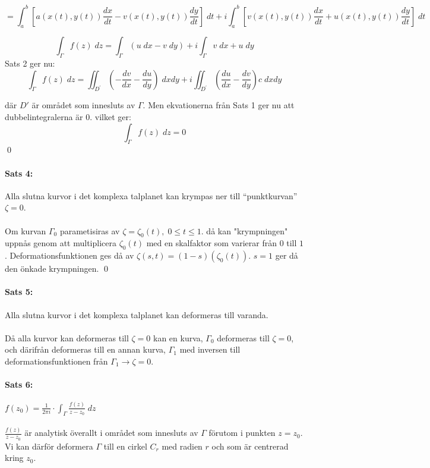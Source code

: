 \documentclass{article}
\begin{document}
$$= \int_a^b \left [a(x(t), y(t)) \frac {dx} {dt} - v(x(t), y(t)) \frac {dy} {dt} \right ] \; dt + i \int_a^b \left [v(x(t), y(t)) \frac {dx} {dt} + 
u(x(t), y (t)) \frac {dy} {dt} \right ] \; dt$$

$$\int_{\Gamma} f(z) \; dz = \int_\Gamma (u \; dx - v \; dy) + i \int_\Gamma v \; dx + u \; dy$$
Sats 2 ger nu:
$$\int_{\Gamma} f(z) \; dz = \iint_{D^\prime} \left ( - \frac {dv} {dx} - \frac {du} {dy} \right ) \; dxdy +
i \iint_{D^\prime} \left ( \frac {du} {dx} - \frac {dv} {dy} \right )c \; dxdy$$

där $D'$ är området som innesluts av $\Gamma$. Men ekvationerna från Sats 1 ger nu att
dubbelintegralerna är $0$. vilket ger:
$$\int_\Gamma f(z) \; dz = 0$$
\hfill \qed

\paragraph{Sats 4:} Alla slutna kurvor i det komplexa talplanet kan krympas ner till ``punktkurvan'' $\zeta = 0$.\\
\\
Om kurvan $\Gamma_0$ parametisiras av $\zeta = \zeta_0(t), \; 0 \le t \le 1.$
då kan "krympningen" uppnås genom att multiplicera $\zeta_0(t)$ med en skalfaktor som varierar från $0$ till $1$. 
Deformationsfunktionen ges då av $\zeta(s, t) = (1-s)(\zeta_0(t)).$ $s = 1$ ger då den önkade krympningen.
\hfill \qed

\paragraph{Sats 5:} Alla slutna kurvor i det komplexa talplanet kan deformeras till varanda.\\
\\
Då alla kurvor kan deformeras till $\zeta = 0$ kan en kurva, $\Gamma_0$ deformeras till $\zeta = 0$, och därifrån deformeras 
till en annan kurva, $\Gamma_1$ med inversen till deformationsfunktionen från $\Gamma_1 \to \zeta = 0$.\\

\paragraph{Sats 6:} $f(z_0) = \frac 1 {2\pi i} \cdot \int_\Gamma \frac {f(z)} {z - z_0} \; dz$ \\
\\
$\frac {f(z)} {z - z_0}$ är analytisk överallt i området som innesluts av $\Gamma$ förutom i punkten
$z = z_0$. Vi kan därför deformera $\Gamma$ till en cirkel $C_r$ med radien $r$ och 
som är centrerad kring $z_0$.
\end{document}
